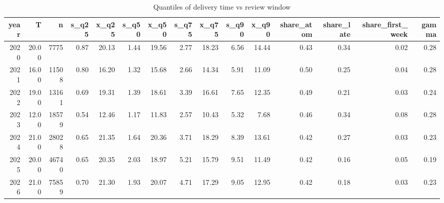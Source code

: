 \begin{table}
\caption{Quantiles of delivery time vs review window}
\label{tab:parkinson}
\begin{tabular}{rrrrrrrrrrrrrrr}
\toprule
year & T & n & s\_q25 & x\_q25 & s\_q50 & x\_q50 & s\_q75 & x\_q75 & s\_q90 & x\_q90 & share\_atom & share\_late & share\_first\_week & gamma \\
\midrule
2020 & 20.00 & 7775 & 0.87 & 20.13 & 1.44 & 19.56 & 2.77 & 18.23 & 6.56 & 14.44 & 0.43 & 0.34 & 0.02 & 0.28 \\
2021 & 16.00 & 11508 & 0.80 & 16.20 & 1.32 & 15.68 & 2.66 & 14.34 & 5.91 & 11.09 & 0.50 & 0.25 & 0.04 & 0.28 \\
2022 & 19.00 & 13161 & 0.69 & 19.31 & 1.39 & 18.61 & 3.39 & 16.61 & 7.65 & 12.35 & 0.49 & 0.21 & 0.03 & 0.24 \\
2023 & 12.00 & 18579 & 0.54 & 12.46 & 1.17 & 11.83 & 2.57 & 10.43 & 5.32 & 7.68 & 0.46 & 0.34 & 0.08 & 0.28 \\
2024 & 21.00 & 28028 & 0.65 & 21.35 & 1.64 & 20.36 & 3.71 & 18.29 & 8.39 & 13.61 & 0.42 & 0.27 & 0.03 & 0.23 \\
2025 & 20.00 & 46740 & 0.65 & 20.35 & 2.03 & 18.97 & 5.21 & 15.79 & 9.51 & 11.49 & 0.42 & 0.16 & 0.05 & 0.19 \\
2026 & 21.00 & 75859 & 0.70 & 21.30 & 1.93 & 20.07 & 4.71 & 17.29 & 9.05 & 12.95 & 0.42 & 0.18 & 0.03 & 0.23 \\
\bottomrule
\end{tabular}
\end{table}
